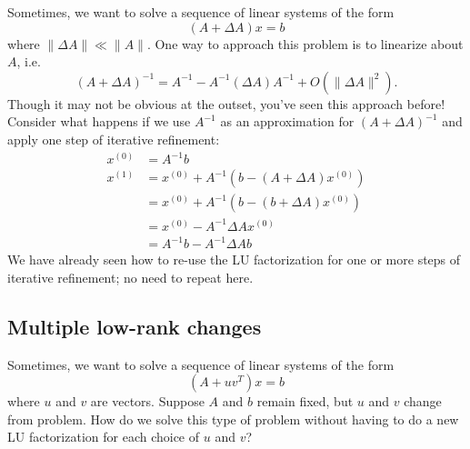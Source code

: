 \documentclass[12pt, leqno]{article}
\begin{document}
Sometimes, we want to solve a sequence of linear systems of the form
\[
  (A + \Delta A) x = b
\]
where $\|\Delta A\| \ll \|A\|$.  One way to approach this problem is
to linearize about $A$, i.e.
\[
  (A + \Delta A)^{-1} = A^{-1} - A^{-1} (\Delta A) A^{-1} + O(\|\Delta A\|^2).
\]
Though it may not be obvious at the outset, you've seen this approach
before!  Consider what happens if we use $A^{-1}$ as an approximation
for $(A+\Delta A)^{-1}$ and apply one step of iterative refinement:
\begin{align*}
  x^{(0)} &= A^{-1} b \\
  x^{(1)}
    &= x^{(0)} + A^{-1} \left( b - (A+\Delta A) x^{(0)} \right) \\
    &= x^{(0)} + A^{-1} \left( b - (b + \Delta A) x^{(0)} \right) \\
    &= x^{(0)} - A^{-1} \Delta A x^{(0)} \\
    &= A^{-1} b - A^{-1} \Delta A b
\end{align*}
We have already seen how to re-use the LU factorization for one or
more steps of iterative refinement; no need to repeat here.

\subsection*{Multiple low-rank changes}

Sometimes, we want to solve a sequence of linear systems of the form
\[
  (A+uv^T) x = b
\]
where $u$ and $v$ are vectors.  Suppose $A$ and $b$ remain fixed,
but $u$ and $v$ change from problem.  How do we solve this type
of problem without having to do a new LU factorization for each
choice of $u$ and $v$?
\end{document}
